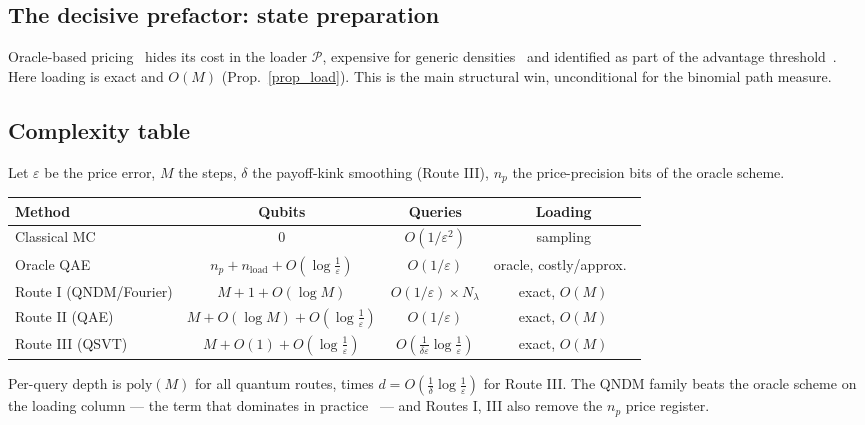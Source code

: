 \documentclass[11pt]{article}
\begin{document}
\subsection{The decisive prefactor: state preparation}
Oracle-based pricing~\cite{Stamatopoulos_2020} hides its cost in the loader $\mathcal{P}$, expensive for generic densities~\cite{grover2002creating} and identified as part of the advantage threshold~\cite{chakrabarti2021threshold}. Here loading is exact and $O(M)$ (Prop.~\ref{prop_load}). This is the main structural win, unconditional for the binomial path measure.

\subsection{Complexity table}
Let $\varepsilon$ be the price error, $M$ the steps, $\delta$ the payoff-kink smoothing (Route III), $n_p$ the price-precision bits of the oracle scheme.
\begin{center}
\renewcommand{\arraystretch}{1.3}
\begin{tabular}{lccc}
\toprule
\textbf{Method} & \textbf{Qubits} & \textbf{Queries} & \textbf{Loading} \\
\midrule
Classical MC~\cite{glasserman2004monte} & $0$ & $O(1/\varepsilon^2)$ & sampling \\
Oracle QAE~\cite{Stamatopoulos_2020} & $n_p+n_{\text{load}}+O(\log\tfrac1\varepsilon)$ & $O(1/\varepsilon)$ & oracle, costly/approx.~\cite{grover2002creating} \\
Route I (QNDM/Fourier) & $M+1+O(\log M)$ & $O(1/\varepsilon)\times N_\lambda$ & exact, $O(M)$ \\
Route II (QAE) & $M+O(\log M)+O(\log\tfrac1\varepsilon)$ & $O(1/\varepsilon)$ & exact, $O(M)$ \\
Route III (QSVT) & $M+O(1)+O(\log\tfrac1\varepsilon)$ & $O(\tfrac{1}{\delta\varepsilon}\log\tfrac1\varepsilon)$ & exact, $O(M)$ \\
\bottomrule
\end{tabular}
\end{center}
Per-query depth is $\mathrm{poly}(M)$ for all quantum routes, times $d=O(\tfrac1\delta\log\tfrac1\varepsilon)$ for Route III. The QNDM family beats the oracle scheme on the loading column --- the term that dominates in practice~\cite{chakrabarti2021threshold} --- and Routes I, III also remove the $n_p$ price register.
\end{document}
